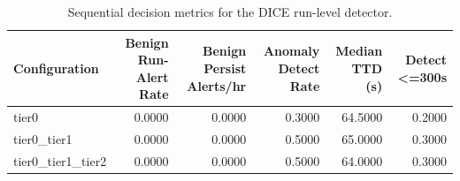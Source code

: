 \begin{table}[t]
\centering
\caption{Sequential decision metrics for the DICE run-level detector.}
\label{tab:dice_sequential_metrics}
\footnotesize
\begin{tabular}{lrrrrr}
\toprule
Configuration & Benign Run-Alert Rate & Benign Persist Alerts/hr & Anomaly Detect Rate & Median TTD (s) & Detect <=300s \\
\midrule
tier0 & 0.0000 & 0.0000 & 0.3000 & 64.5000 & 0.2000 \\
tier0_tier1 & 0.0000 & 0.0000 & 0.5000 & 65.0000 & 0.3000 \\
tier0_tier1_tier2 & 0.0000 & 0.0000 & 0.5000 & 64.0000 & 0.3000 \\
\bottomrule
\end{tabular}

\end{table}
